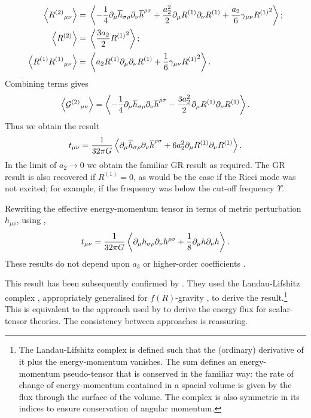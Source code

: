 \begin{subequations}
\begin{align}
\left\langle {R^{(2)}}_{\mu\nu} \right\rangle = {} & \left\langle -\frac{1}{4} \partial_\mu\overline{h}_{\sigma\rho}\partial_\nu\overline{h}^{\rho\sigma} + \frac{a_2^2}{2}\partial_\mu R^{(1)}\partial_\nu R^{(1)} + \frac{a_2}{6}\gamma_{\mu\nu} {R^{(1)}}^2 \right\rangle; \\
\left\langle R^{(2)} \right\rangle = {} & \left\langle \frac{3a_2}{2}{R^{(1)}}^2 \right\rangle; \\
\left\langle R^{(1)}{R^{(1)}}_{\mu\nu} \right\rangle = {} & \left\langle a_2 R^{(1)} \partial_\mu\partial_\nu R^{(1)} + \frac{1}{6}\gamma_{\mu\nu}{R^{(1)}}^2\right\rangle.
\end{align}
\end{subequations}
Combining terms gives
\begin{equation}
\left\langle {\mathcal{G}^{(2)}}_{\mu\nu}\right\rangle = \left\langle -\frac{1}{4} \partial_\mu\overline{h}_{\sigma\rho}\partial_\nu\overline{h}^{\rho\sigma} - \frac{3a_2^2}{2}\partial_\mu R^{(1)}\partial_\nu R^{(1)} \right\rangle.
\end{equation}
Thus we obtain the result
\begin{equation}
t_{\mu\nu} = \frac{1}{32\pi G}\left\langle \partial_\mu\overline{h}_{\sigma\rho}\partial_\nu\overline{h}^{\rho\sigma} + 6a_2^2\partial_\mu R^{(1)}\partial_\nu R^{(1)} \right\rangle.
\label{eq:Pseudotensor}
\end{equation}
In the limit of $a_2 \rightarrow 0$ we obtain the familiar GR result as required. The GR result is also recovered if $R^{(1)} = 0$, as would be the case if the Ricci mode was not excited; for example, if the frequency was below the cut-off frequency $\Upsilon$.

Rewriting the effective energy-momentum tensor in terms of metric perturbation $h_{\mu\nu}$, using ,
\begin{equation}
t_{\mu\nu} = \frac{1}{32\pi G}\left\langle \partial_\mu h_{\sigma\rho}\partial_\nu h^{\rho\sigma} + \frac{1}{8}\partial_\mu h \partial_\nu h \right\rangle.
\end{equation}
These results do not depend upon $a_3$ or higher-order coefficients \citep{Stein2011}.

This result has been subsequently confirmed by \citet{Naf2011}. They used the Landau-Lifshitz complex \citep[section 94]{Landau1975}, appropriately generalised for $f(R)$-gravity \citep{Nutku1969}, to derive the result.\footnote{The Landau-Lifshitz complex is defined such that the (ordinary) derivative of it plus the energy-momentum vanishes. The sum defines an energy-momentum pseudo-tensor that is conserved in the familiar way: the rate of change of energy-momentum contained in a spacial volume is given by the flux through the surface of the volume. The complex is also symmetric in its indices to ensure conservation of angular momentum.} This is equivalent to the approach used by \citet[section 10.3]{Will1993} to derive the energy flux for scalar-tensor theories. The consistency between approaches is reassuring. %

